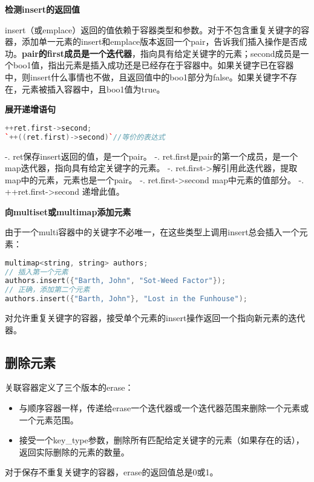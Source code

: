 \documentclass[
  a4paper,
  oneside,tablecaptionabove
]{scrbook}
\begin{document}
\textbf{检测insert的返回值}

insert（或emplace）返回的值依赖于容器类型和参数。对于不包含重复关键字的容器，添加单一元素的insert和emplace版本返回一个pair，告诉我们插入操作是否成功。\textbf{pair的first成员是一个迭代器}，指向具有给定关键字的元素；second成员是一个boo1值，指出元素是插入成功还是已经存在于容器中。如果关键字已在容器中，则insert什么事情也不做，且返回值中的boo1部分为false。如果关键字不存在，元素被插入容器中，且boo1值为true。

\textbf{展开递增语句}

\begin{lstlisting}[language={C++}]
++ret.first->second;
`++((ret.first)->second)`//等价的表达式
\end{lstlisting}

-. ret保存insert返回的值，是一个pair。 -.
ret.first是pair的第一个成员，是一个map迭代器，指向具有给定关键字的元素。
-.
ret.first-\textgreater{}解引用此迭代器，提取map中的元素，元素也是一个pair。
-. ret.first-\textgreater{}second map中元素的值部分。 -.
++ret.first-\textgreater{}second 递增此值。

\textbf{向multiset或multimap添加元素}

由于一个multi容器中的关键字不必唯一，在这些类型上调用insert总会插入一个元素：

\begin{lstlisting}[language={C++}]
multimap<string, string> authors;
// 插入第一个元素
authors.insert({"Barth, John", "Sot-Weed Factor"});
// 正确，添加第二个元素
authors.insert({"Barth, John"}, "Lost in the Funhouse");
\end{lstlisting}

对允许重复关键字的容器，接受单个元素的insert操作返回一个指向新元素的迭代器。

\subsection{删除元素}\label{ux5220ux9664ux5143ux7d20}

关联容器定义了三个版本的erase：

\begin{itemize}
\item
  与顺序容器一样，传递给erase一个迭代器或一个迭代器范围来删除一个元素或一个元素范围。
\item
  接受一个key\_type参数，删除所有匹配给定关键字的元素（如果存在的话），返回实际删除的元素的数量。
\end{itemize}

对于保存不重复关键字的容器，erase的返回值总是0或1。
\end{document}
